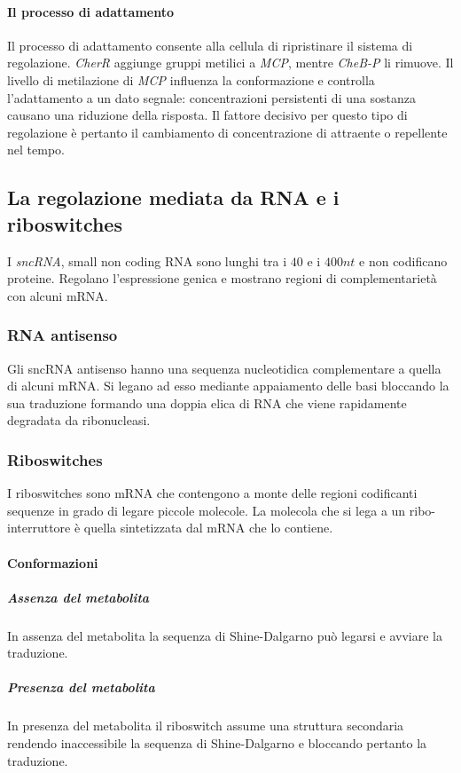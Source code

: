 			\paragraph{Il processo di adattamento}
			Il processo di adattamento consente alla cellula di ripristinare il sistema di regolazione.
			\emph{CherR} aggiunge gruppi metilici a \emph{MCP}, mentre \emph{CheB-P} li rimuove.
			Il livello di metilazione di \emph{MCP} influenza la conformazione e controlla l'adattamento a un dato segnale: concentrazioni persistenti di una sostanza causano una riduzione della risposta.
			Il fattore decisivo per questo tipo di regolazione \`e pertanto il cambiamento di concentrazione di attraente o repellente nel tempo.

	\subsection{La regolazione mediata da RNA e i riboswitches}
	I \emph{sncRNA}, small non coding RNA sono lunghi tra i $40$ e i $400nt$ e non codificano proteine.
	Regolano l'espressione genica e mostrano regioni di complementariet\`a con alcuni mRNA.

		\subsubsection{RNA antisenso}
		Gli sncRNA antisenso hanno una sequenza nucleotidica complementare a quella di alcuni mRNA.
		Si legano ad esso mediante appaiamento delle basi bloccando la sua traduzione formando una doppia elica di RNA che viene rapidamente degradata da ribonucleasi.

		\subsubsection{Riboswitches}
		I riboswitches sono mRNA che contengono a monte delle regioni codificanti sequenze in grado di legare piccole molecole.
		La molecola che si lega a un ribo-interruttore \`e quella sintetizzata dal mRNA che lo contiene.

			\paragraph{Conformazioni}

				\subparagraph{Assenza del metabolita}
				In assenza del metabolita la sequenza di Shine-Dalgarno pu\`o legarsi e avviare la traduzione.

				\subparagraph{Presenza del metabolita}
				In presenza del metabolita il riboswitch assume una struttura secondaria rendendo inaccessibile la sequenza di Shine-Dalgarno e bloccando pertanto la traduzione.
